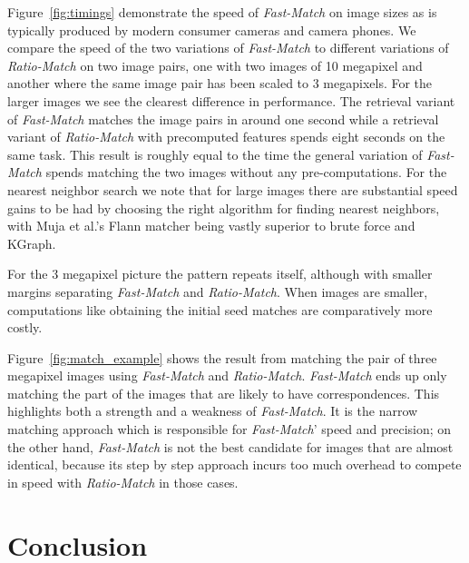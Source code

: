 \documentclass[runningheads]{llncs}
\begin{document}
Figure~\ref{fig:timings} demonstrate the speed of \emph{Fast-Match} on
image sizes as is typically produced by modern consumer cameras and
camera phones. We compare the speed of the two variations of \emph{Fast-Match} to different variations of \emph{Ratio-Match} on two image pairs, one with two images of 10 megapixel and another where the same image pair has been scaled to 3 megapixels. For the larger images we see the clearest difference in performance. The retrieval variant of \emph{Fast-Match} matches the image pairs in around one second while a retrieval variant of \emph{Ratio-Match} with precomputed features spends eight seconds on the same task. This result is roughly equal to the time the general variation of \emph{Fast-Match} spends matching the two images without any pre-computations. For the nearest neighbor search we note that for large images there are substantial speed gains to be had by choosing the right algorithm for finding nearest neighbors, with Muja et al.'s Flann matcher being vastly superior to brute force and KGraph. 

For the 3 megapixel picture the pattern repeats itself, although with smaller margins separating \emph{Fast-Match} and \emph{Ratio-Match}. When images are smaller, computations like obtaining the initial seed matches are comparatively more costly.

Figure~\ref{fig:match_example} shows the result from matching the pair of three megapixel images using \emph{Fast-Match} and \emph{Ratio-Match}. %
\emph{Fast-Match} ends up only matching the part of the images that are
likely to have correspondences. This highlights both a strength and a
weakness of \emph{Fast-Match}. It is the narrow matching approach which is responsible for \emph{Fast-Match}' speed and precision; on the other hand, \emph{Fast-Match} is not the best candidate for images that are almost identical, because its step by step approach incurs too much overhead to compete in speed with \emph{Ratio-Match} in those cases.

\section{Conclusion}
\label{conclusion}
\end{document}
